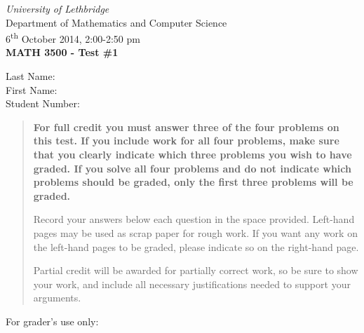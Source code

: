 \documentclass[12pt]{article}
\newcommand{\skipline}{\vspace{12pt}}
\begin{document}
\author{Instructor: Sean Fitzpatrick}
\thispagestyle{plain}
\begin{center}
\emph{University of Lethbridge}\\
Department of Mathematics and Computer Science\\
6\textsuperscript{th} October 2014, 2:00-2:50 pm\\
{\bf MATH 3500 - Test \#1}\\
\end{center}
\skipline \skipline \skipline \noindent \skipline
Last Name:\underline{\hspace{50pt}{\bf SOLUTIONS}\hspace{50pt}}\\
\skipline
First Name:\underline{\hspace{50pt}{\bf THE}\hspace{100pt}}\\
\skipline
Student Number:\underline{\hspace{322pt}}\\
\skipline

\vspace{0.5in}


\begin{quote}
{\bf For full credit you must answer three of the four problems on this test. If you include work for all four problems, make sure that you clearly indicate which three problems you wish to have graded. If you solve all four problems and do not indicate which problems should be graded, only the {\bf first three} problems will be graded.}

\bigskip
 
 {Record your answers below each question in the space provided.    Left-hand pages may be used as scrap paper for rough work.  If you want any work on the left-hand pages to be graded, please indicate so on the right-hand page.
 
 \bigskip
 
Partial credit will be awarded for partially correct work, so be sure to show your work, and include all necessary justifications needed to support your arguments. }

\end{quote}


\vspace{0.5in}

For grader's use only:
\end{document}
